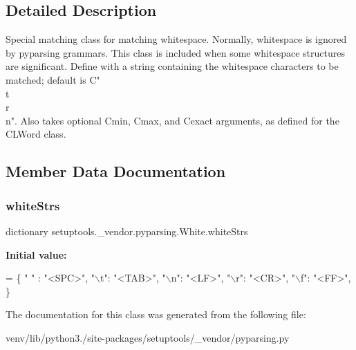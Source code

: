 \subsection{Detailed Description}
\begin{DoxyVerb}Special matching class for matching whitespace.  Normally, whitespace is ignored
by pyparsing grammars.  This class is included when some whitespace structures
are significant.  Define with a string containing the whitespace characters to be
matched; default is C{" \\t\\r\\n"}.  Also takes optional C{min}, C{max}, and C{exact} arguments,
as defined for the C{L{Word}} class.
\end{DoxyVerb}
 

\subsection{Member Data Documentation}
\mbox{\label{classsetuptools_1_1__vendor_1_1pyparsing_1_1_white_a6ba0cae3eb9ceb599e3c4aa6dd97b8b7}} 
\subsubsection{\texorpdfstring{white\+Strs}{whiteStrs}}
{\footnotesize\ttfamily dictionary setuptools.\+\_\+vendor.\+pyparsing.\+White.\+white\+Strs\hspace{0.3cm}{\ttfamily [static]}}

{\bfseries Initial value\+:}
\begin{DoxyCode}
=  \{
        \textcolor{stringliteral}{" "} : \textcolor{stringliteral}{"<SPC>"},
        \textcolor{stringliteral}{"\(\backslash\)t"}: \textcolor{stringliteral}{"<TAB>"},
        \textcolor{stringliteral}{"\(\backslash\)n"}: \textcolor{stringliteral}{"<LF>"},
        \textcolor{stringliteral}{"\(\backslash\)r"}: \textcolor{stringliteral}{"<CR>"},
        \textcolor{stringliteral}{"\(\backslash\)f"}: \textcolor{stringliteral}{"<FF>"},
        \}
\end{DoxyCode}


The documentation for this class was generated from the following file\+:\begin{DoxyCompactItemize}
\item 
venv/lib/python3./site-\/packages/setuptools/\+\_\+vendor/pyparsing.\+py\end{DoxyCompactItemize}

